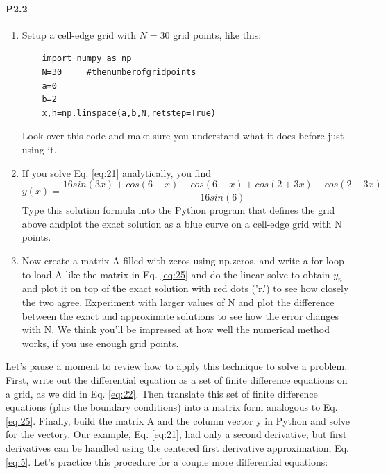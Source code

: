 \documentclass{book}
\theoremstyle{plain}
\theoremstyle{definition}
\numberwithin{exm}{chapter}
\theoremstyle{remark}
\theoremstyle{summary}
\theoremstyle{overview}
\begin{document}
\paragraph*{P2.2}
\begin{enumerate}[label=(\alph*)]
	\item  Setup a cell-edge grid with $N=30$ grid points, like this: 
	\begin{lstlisting}	
	import numpy as np 
	N=30     #thenumberofgridpoints 
	a=0 
	b=2 
	x,h=np.linspace(a,b,N,retstep=True)
	\end{lstlisting}	
	 Look over this code and make sure you understand what it does before just using it.
	\item If you solve Eq. \eqref{eq:21} analytically, you find
	\begin{equation}
	y(x) = \frac{16sin(3x)+cos(6-x)-cos(6+x)+cos(2+3x)-cos(2-3x)}{16sin(6)}
\end{equation}		
		Type this solution formula into the Python program that defines the grid above andplot the exact solution as a blue curve on a cell-edge grid with N points.

		\item Now create a matrix A filled with zeros using np.zeros, and write a for loop to load A like the matrix in Eq. \eqref{eq:25} and do the linear solve to obtain $y_n$ and plot it on top of the exact solution with red dots ('r.') to see how closely the two agree. Experiment with larger values of N and plot the difference between the exact and approximate solutions to see how the error changes with N. We think you\rq ll be impressed at how well the numerical method works, if you use enough grid points.
\end{enumerate}

Let\rq s pause a moment to review how to apply this technique to solve a problem. First, write out the differential equation as a set of finite difference equations on a grid, as we did in Eq. \eqref{eq:22}. Then translate this set of finite difference equations (plus the boundary conditions) into a matrix form analogous to Eq. \eqref{eq:25}. Finally, build the matrix A and the column vector y in Python and solve for the vectory. Our example, Eq. \eqref{eq:21}, had only a second derivative, but first derivatives can be handled using the centered first derivative approximation, Eq. \eqref{eq:5}. Let\rq s practice this procedure for a couple more differential equations:
\end{document}
